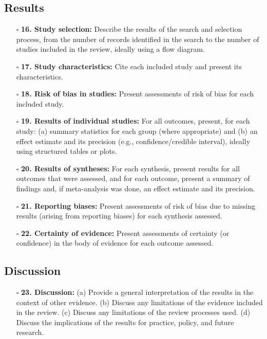 \documentclass[11pt]{article}
\def\tightlist{}
\begin{document}
\begin{Form}
\subsection{Results}\label{results}

\begin{itemize}
\tightlist
\item[$\square$]
  \textbf{16. Study selection:} Describe the results of the search and
  selection process, from the number of records identified in the search
  to the number of studies included in the review, ideally using a flow
  diagram.
\item[$\square$]
  \textbf{17. Study characteristics:} Cite each included study and
  present its characteristics.
\item[$\square$]
  \textbf{18. Risk of bias in studies:} Present assessments of risk of
  bias for each included study.
\item[$\square$]
  \textbf{19. Results of individual studies:} For all outcomes, present,
  for each study: (a) summary statistics for each group (where
  appropriate) and (b) an effect estimate and its precision (e.g.,
  confidence/credible interval), ideally using structured tables or
  plots.
\item[$\square$]
  \textbf{20. Results of syntheses:} For each synthesis, present results
  for all outcomes that were assessed, and for each outcome, present a
  summary of findings and, if meta-analysis was done, an effect estimate
  and its precision.
\item[$\square$]
  \textbf{21. Reporting biases:} Present assessments of risk of bias due
  to missing results (arising from reporting biases) for each synthesis
  assessed.
\item[$\square$]
  \textbf{22. Certainty of evidence:} Present assessments of certainty
  (or confidence) in the body of evidence for each outcome assessed.
\end{itemize}

\subsection{Discussion}\label{discussion}

\begin{itemize}
\tightlist
\item[$\square$]
  \textbf{23. Discussion:} (a) Provide a general interpretation of the
  results in the context of other evidence. (b) Discuss any limitations
  of the evidence included in the review. (c) Discuss any limitations of
  the review processes used. (d) Discuss the implications of the results
  for practice, policy, and future research.
\end{itemize}


\end{Form}
\end{document}
